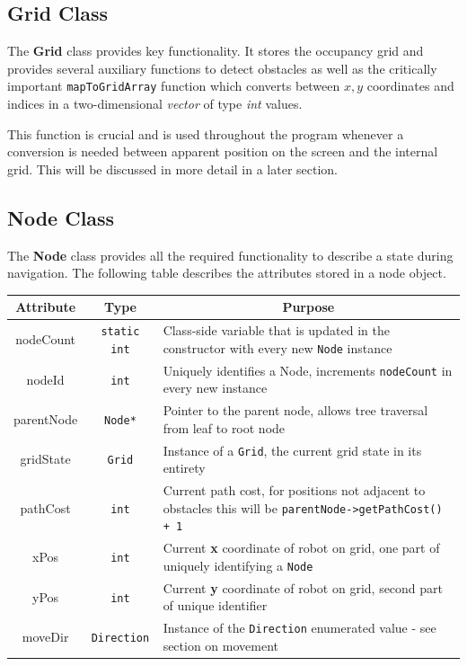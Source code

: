 \documentclass[a4paper,12pt]{article}
\begin{document}
\subsection{Grid Class}
The \textbf{Grid} class provides key functionality. It stores the occupancy grid and provides several auxiliary functions to detect obstacles as well as the critically important \texttt{mapToGridArray} function which converts between $x,y$ coordinates and indices in a two-dimensional \textit{vector} of type \textit{int} values. 

This function is crucial and is used throughout the program whenever a conversion is needed between apparent position on the screen and the internal grid. This will be discussed in more detail in a later section.
\subsection{Node Class}
The \textbf{Node} class provides all the required functionality to describe a state during navigation. The following table describes the attributes stored in a node object.
\begin{table}[h!]
\scriptsize
\begin{tabular}{|c|c|l|}
    \hline
    \multicolumn{1}{|c|}{\textbf{Attribute}} & \multicolumn{1}{c|}{\textbf{Type}} & \multicolumn{1}{c|}{\textbf{Purpose}} \\
    \hline
    nodeCount & \texttt{static int} & Class-side variable that is updated in the constructor with every new \texttt{Node} instance\\
    \hline
    nodeId & \texttt{int} & Uniquely identifies a Node, increments \texttt{nodeCount} in every new instance\\
    \hline
    parentNode & \texttt{Node*} & Pointer to the parent node, allows tree traversal from leaf to root node \\
    \hline
    gridState & \texttt{Grid} & Instance of a \texttt{Grid},  the current grid state in its entirety\\
    \hline
    pathCost & \texttt{int} & Current path cost, for positions not adjacent to obstacles this will be \texttt{parentNode->getPathCost() + 1} \\
    \hline
    xPos & \texttt{int} & Current \textbf{x} coordinate of robot on grid, one part of uniquely identifying a \texttt{Node} \\
    \hline
    yPos & \texttt{int} & Current \textbf{y} coordinate of robot on grid, second part of unique identifier\\
    \hline
    moveDir & \texttt{Direction} & Instance of the \texttt{Direction} enumerated value - see section on movement\\
    \hline
\end{tabular}
\normalsize
\end{table}
\end{document}
